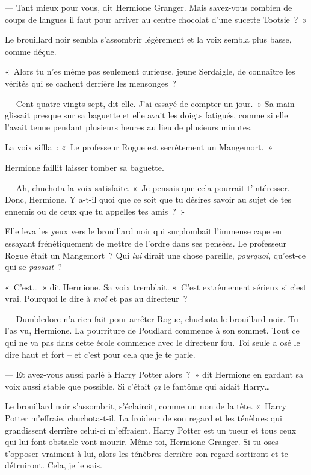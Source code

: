 --- Tant mieux pour vous, dit Hermione Granger. Mais savez-vous combien de coups de langues il faut pour arriver au centre chocolat d'une sucette Tootsie~?~»

Le brouillard noir sembla s'assombrir légèrement et la voix sembla plus basse, comme déçue.

«~Alors tu n'es même pas seulement curieuse, jeune Serdaigle, de connaître les vérités qui se cachent derrière les mensonges~?

--- Cent quatre-vingts sept, dit-elle. J'ai essayé de compter un jour.~» Sa main glissait presque sur sa baguette et elle avait les doigts fatigués, comme si elle l'avait tenue pendant plusieurs heures au lieu de plusieurs minutes.

La voix siffla~: «~Le professeur Rogue est secrètement un Mangemort.~»

Hermione faillit laisser tomber sa baguette.

--- Ah, chuchota la voix satisfaite. «~Je pensais que cela pourrait t'intéresser. Donc, Hermione. Y a-t-il quoi que ce soit que tu désires savoir au sujet de tes ennemis ou de ceux que tu appelles tes amis~?~»

Elle leva les yeux vers le brouillard noir qui surplombait l'immense cape en essayant frénétiquement de mettre de l'ordre dans ses pensées. Le professeur Rogue était un Mangemort~? Qui \emph{lui} dirait une chose pareille, \emph{pourquoi}, qu'est-ce qui se \emph{passait}~?

«~C'est…~» dit Hermione. Sa voix tremblait. «~C'est extrêmement sérieux si c'est vrai. Pourquoi le dire à \emph{moi} et pas au directeur~?

--- Dumbledore n'a rien fait pour arrêter Rogue, chuchota le brouillard noir. Tu l'as vu, Hermione. La pourriture de Poudlard commence à son sommet. Tout ce qui ne va pas dans cette école commence avec le directeur fou. Toi seule a osé le dire haut et fort -- et c'est pour cela que je te parle.

--- Et avez-vous aussi parlé à Harry Potter alors~?~» dit Hermione en gardant sa voix aussi stable que possible. Si c'était \emph{ça} le fantôme qui aidait Harry…

Le brouillard noir s'assombrit, s'éclaircit, comme un non de la tête. «~Harry Potter m'effraie, chuchota-t-il. La froideur de son regard et les ténèbres qui grandissent derrière celui-ci m'effraient. Harry Potter est un tueur et tous ceux qui lui font obstacle vont mourir. Même toi, Hermione Granger. Si tu oses t'opposer vraiment à lui, alors les ténèbres derrière son regard sortiront et te détruiront. Cela, je le sais.

